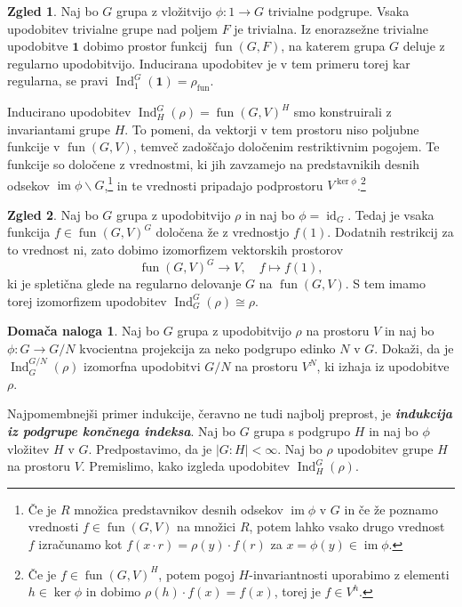 \documentclass[11pt]{book}
\def\11{\mathbf{1}}
\DeclareMathOperator\image{im}
\DeclareMathOperator\Ind{Ind}
\DeclareMathOperator\fun{fun}
\DeclareMathOperator\id{id}
\def\definicija{\color{rdeca}\bf\em}
\theoremstyle{definition}
\theoremstyle{zgled}
\newtheorem*{zgled}{Zgled}
\theoremstyle{odprtproblem}
\theoremstyle{domacanaloga}
\newtheorem*{domacanaloga}{Domača naloga}
\theoremstyle{izrek}
\begin{document}
\begin{zgled}
Naj bo $G$ grupa z vložitvijo $\phi \colon 1 \to G$ trivialne podgrupe. Vsaka upodobitev trivialne grupe nad poljem $F$ je trivialna. Iz enorazsežne trivialne upodobitve $\11$ dobimo prostor funkcij $\fun(G,F)$, na katerem grupa $G$ deluje z regularno upodobitvijo. Inducirana upodobitev je v tem primeru torej kar regularna, se pravi $\Ind^G_1(\11) = \rho_{\fun}$.
\end{zgled}

Inducirano upodobitev $\Ind^G_H(\rho) = \fun(G,V)^H$ smo konstruirali z invariantami grupe $H$. To pomeni, da vektorji v tem prostoru niso poljubne funkcije v $\fun(G,V)$, temveč zadoščajo določenim restriktivnim pogojem. Te funkcije so določene z vrednostmi, ki jih zavzamejo na predstavnikih desnih odsekov $\image \phi \backslash G$,\footnote{Če je $R$ množica predstavnikov desnih odsekov $\image \phi$ v $G$ in če že poznamo vrednosti $f \in \fun(G,V)$ na množici $R$, potem lahko vsako drugo vrednost $f$ izračunamo kot $f(x \cdot r) = \rho(y) \cdot f(r)$ za $x = \phi(y) \in \image \phi$.} in te vrednosti pripadajo podprostoru $V^{\ker \phi}$.\footnote{Če je $f \in \fun(G,V)^H$, potem pogoj $H$-invariantnosti uporabimo z elementi $h \in \ker \phi$ in dobimo $\rho(h) \cdot f(x) = f(x)$, torej je $f \in V^h$.}

\begin{zgled}
Naj bo $G$ grupa z upodobitvijo $\rho$ in naj bo $\phi = \id_G$. Tedaj je vsaka funkcija $f \in \fun(G,V)^G$ določena že z vrednostjo $f(1)$. Dodatnih restrikcij za to vrednost ni, zato dobimo izomorfizem vektorskih prostorov
    \[
        \fun(G,V)^G \to V, \quad
        f \mapsto f(1),
    \]
ki je spletična glede na regularno delovanje $G$ na $\fun(G,V)$. S tem imamo torej izomorfizem upodobitev $\Ind^G_G(\rho) \cong \rho$.
\end{zgled}

\begin{domacanaloga}
    Naj bo $G$ grupa z upodobitvijo $\rho$ na prostoru $V$ in naj bo $\phi \colon G \to G/N$ kvocientna projekcija za neko podgrupo edinko $N$ v $G$. Dokaži, da je $\Ind^{G/N}_G(\rho)$ izomorfna upodobitvi $G/N$ na prostoru $V^N$, ki izhaja iz upodobitve $\rho$.
\end{domacanaloga}

Najpomembnejši primer indukcije, čeravno ne tudi najbolj preprost, je {\definicija indukcija iz podgrupe končnega indeksa}. Naj bo $G$ grupa s podgrupo $H$ in naj bo $\phi$ vložitev $H$ v $G$. Predpostavimo, da je $|G:H| < \infty$. Naj bo $\rho$ upodobitev grupe $H$ na prostoru $V$. Premislimo, kako izgleda upodobitev $\Ind^G_H(\rho)$. 
    
\end{document}
